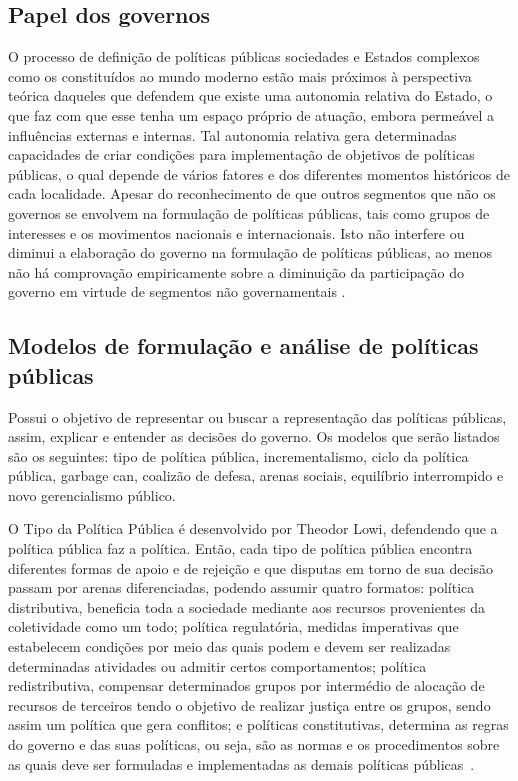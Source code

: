 \subsection{Papel dos governos}


O processo de definição de políticas públicas sociedades e Estados complexos como os constituídos ao mundo moderno estão mais próximos à perspectiva teórica daqueles que defendem que existe uma autonomia relativa do Estado, o que faz com que esse tenha um espaço próprio de atuação, embora permeável a influências externas e internas.
Tal autonomia relativa gera determinadas capacidades de criar condições para implementação de objetivos de políticas públicas, o qual depende de vários fatores e dos diferentes momentos históricos de cada localidade.
Apesar do reconhecimento de que outros segmentos que não os governos se envolvem na formulação de políticas públicas, tais como grupos de interesses e os movimentos nacionais e internacionais. Isto não interfere ou diminui a elaboração do governo na formulação de políticas públicas, ao menos não há comprovação empiricamente sobre a diminuição da participação do governo em virtude de segmentos não governamentais \cite{souza2006politicas}.


\subsection{Modelos de formulação e análise de políticas públicas}


Possui o objetivo de representar ou buscar a representação das políticas públicas, assim, explicar e entender as decisões do governo. 
Os modelos que serão listados são os seguintes: tipo de política pública, incrementalismo, ciclo da política pública, garbage can, coalizão de defesa, arenas sociais, equilíbrio interrompido e novo gerencialismo público.

O Tipo da Política Pública é desenvolvido por Theodor Lowi, defendendo que a política pública faz a política.
Então, cada tipo de política pública encontra diferentes formas de apoio e de rejeição e que disputas em torno de sua decisão passam por arenas diferenciadas, podendo assumir quatro formatos: política distributiva, beneficia toda a sociedade mediante aos recursos provenientes da coletividade como um todo; política regulatória, medidas imperativas que estabelecem condições por meio das quais podem e devem ser realizadas determinadas atividades ou admitir certos comportamentos; política redistributiva, compensar determinados grupos por intermédio de alocação de recursos de terceiros tendo o objetivo de realizar justiça entre os grupos, sendo assim um política que gera conflitos; e políticas constitutivas, determina as regras do governo e das suas políticas, ou seja, são as normas e os procedimentos sobre as quais deve ser formuladas e implementadas as demais políticas públicas~\cite{rua2013}.

